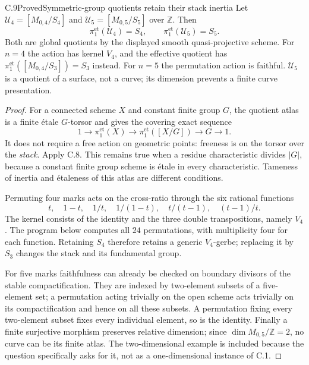 \begin{statement}{C.9}{Proved}{Symmetric-group quotients retain their stack inertia}
Let $\mathcal U_4=[M_{0,4}/S_4]$ and
$\mathcal U_5=[M_{0,5}/S_5]$ over $\mathbb Z$. Then
\[
 \pi_1^{\mathrm{et}}(\mathcal U_4)=S_4,
 \qquad
 \pi_1^{\mathrm{et}}(\mathcal U_5)=S_5.
\]
Both are global quotients by the displayed smooth
quasi-projective scheme. For $n=4$ the action has kernel
$V_4$, and the effective quotient has
$\pi_1^{\mathrm{et}}([M_{0,4}/S_3])=S_3$ instead.
For $n=5$ the permutation action is faithful.
$\mathcal U_5$ is a quotient of a surface, not a curve;
its dimension prevents a finite curve presentation.
\end{statement}
\begin{proof}
For a connected scheme $X$ and constant finite group $G$,
the quotient atlas is a finite \'etale $G$-torsor and gives
the covering exact sequence
\[
 1\longrightarrow\pi_1^{\mathrm{et}}(X)
 \longrightarrow\pi_1^{\mathrm{et}}([X/G])
 \longrightarrow G\longrightarrow1.
\]
It does not require a free action on geometric points:
freeness is on the torsor over the \emph{stack}. Apply C.8.
This remains true when a residue characteristic divides
$|G|$, because a constant finite group scheme is \'etale
in every characteristic. Tameness of inertia and \'etaleness
of this atlas are different conditions.

Permuting four marks acts on the cross-ratio through the
six rational functions
\[
 t,\quad 1-t,\quad 1/t,\quad 1/(1-t),\quad
 t/(t-1),\quad (t-1)/t.
\]
The kernel consists of the identity and the three double
transpositions, namely $V_4$. The program below computes
all $24$ permutations, with multiplicity four for each
function. Retaining $S_4$ therefore retains a generic
$V_4$-gerbe; replacing it by $S_3$ changes the stack and
its fundamental group.

For five marks faithfulness can already be checked on
boundary divisors of the stable compactification. They
are indexed by two-element subsets of a five-element
set; a permutation acting trivially on the open scheme
acts trivially on its compactification and hence on all
these subsets. A permutation fixing every two-element
subset fixes every individual element, so is the identity.
Finally a finite surjective morphism preserves relative
dimension; since $\dim M_{0,5}/\mathbb Z=2$, no curve can
be its finite atlas. The two-dimensional example is
included because the question specifically asks for it,
not as a one-dimensional instance of C.1.
\end{proof}

